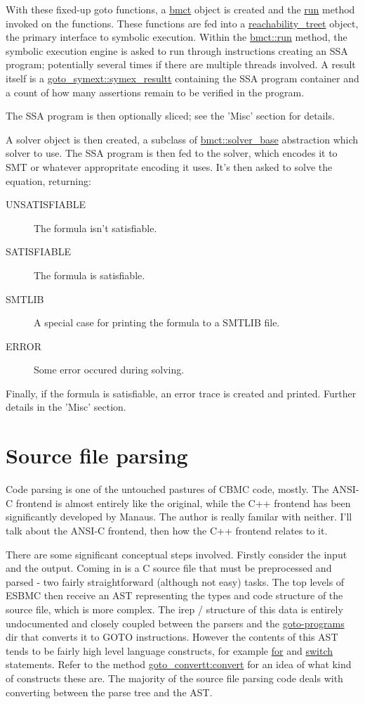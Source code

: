 \documentclass{article}
\begin{document}
With these fixed-up goto functions, a \url{bmct} object is created and the
\url{run} method invoked on the functions. These functions are fed into a
\url{reachability_treet} object, the primary interface to symbolic
execution. Within the \url{bmct::run} method, the symbolic execution engine
is asked to run through instructions creating an SSA program; potentially
several times if there are multiple threads involved. A result itself is a
\url{goto_symext::symex_resultt} containing the SSA program container and
a count of how many assertions remain to be verified in the program.

The SSA program is then optionally sliced; see the 'Misc' section for details.

A solver object is then created, a subclass of \url{bmct::solver_base}
abstraction which solver to use. The SSA program is then fed to the solver,
which encodes it to SMT or whatever appropritate encoding it uses. It's then
asked to solve the equation, returning:
\begin{description}
\item[UNSATISFIABLE] The formula isn't satisfiable.
\item[SATISFIABLE] The formula is satisfiable.
\item[SMTLIB] A special case for printing the formula to a SMTLIB file.
\item[ERROR] Some error occured during solving.
\end{description}

Finally, if the formula is satisfiable, an error trace is created and printed.
Further details in the 'Misc' section.

\section{Source file parsing}

Code parsing is one of the untouched pastures of CBMC code, mostly. The ANSI-C
frontend is almost entirely like the original, while the C++ frontend has been
significantly developed by Manaus. The author is really familar with neither.
I'll talk about the ANSI-C frontend, then how the C++ frontend relates to it.

There are some significant conceptual steps involved. Firstly consider
the input and the output. Coming in is a C source file that must be preprocessed
and parsed - two fairly straightforward (although not easy) tasks. The top
levels of ESBMC then receive an AST representing the types and code structure
of the source file, which is more complex. The irep / structure of this data
is entirely undocumented and closely coupled between the parsers and the
\url{goto-programs} dir that converts it to GOTO instructions. However the
contents of this AST tends to be fairly high level language constructs,
for example \url{for} and \url{switch} statements. Refer to the method
\url{goto_convertt:convert} for an idea of what kind of constructs these
are. The majority of the source file parsing code deals with converting between
the parse tree and the AST.
\end{document}
